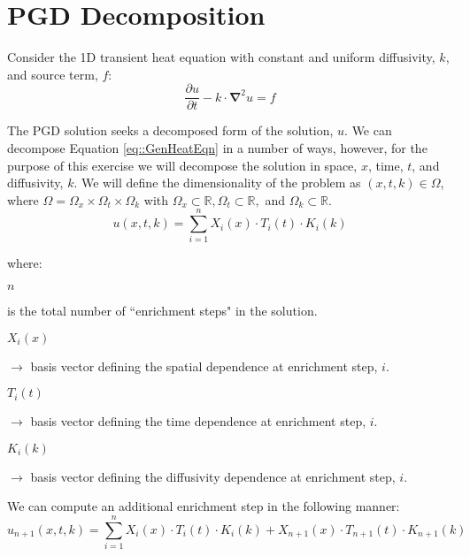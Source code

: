\documentclass{article}
\def\ds{\displaystyle}
\def\pd{\partial}
\def\grad{\mathbf\nabla}
\begin{document}
\section{PGD Decomposition}
Consider the 1D transient heat equation with constant and uniform diffusivity, $k$, and source term, $f$:
\begin{equation}
\label{eq::GenHeatEqn}
\frac{\pd u}{\pd t} -k\cdot \grad^2 u = f
\end{equation}

The PGD solution seeks a decomposed form of the solution, $u$. We can decompose Equation \ref{eq::GenHeatEqn} in a number of ways, however, for the purpose of this exercise we will decompose the solution in space, $x$, time, $t$, and diffusivity, $k$. We will define the dimensionality of the problem as $\left( x,t,k \right) \in \Omega$, where $\Omega = \Omega_x \times \Omega_t \times \Omega_k$ with $\Omega_x \subset \mathbb{R}, \Omega_t \subset \mathbb{R},$ and $\Omega_k \subset \mathbb{R}$.
\begin{equation}
u(x,t,k) = \ds\sum_{i=1}^n X_i(x) \cdot T_i(t) \cdot K_i(k)
\end{equation}

\vspace{-6pt}where:\\[-3pt]

\hspace*{15pt}\begin{minipage}{4.5in}

$n$ 
\parbox[t][0.65cm]{4.5in}{ is the total number of ``enrichment steps" in the solution.}

$X_i(x)$ 
\parbox[t][0.65cm]{4.5in}{ $\to$ basis vector defining the spatial dependence at enrichment step, $i$.}

$T_i(t)$ 
\parbox[t][0.65cm]{4.5in}{ $\to$ basis vector defining the time dependence at enrichment step, $i$.}

$K_i(k)$ 
\parbox[t][0.65cm]{4.5in}{ $\to$ basis vector defining the diffusivity dependence at enrichment step, $i$.}

\end{minipage}\vspace{5pt}

We can compute an additional enrichment step in the following manner:
\begin{equation}
\label{eq::TrialFctn}
u_{n+1}(x,t,k) = \ds\sum_{i=1}^n X_i(x) \cdot T_i(t) \cdot K_i(k) + X_{n+1}(x) \cdot T_{n+1}(t) \cdot K_{n+1}(k)
\end{equation}
\end{document}
